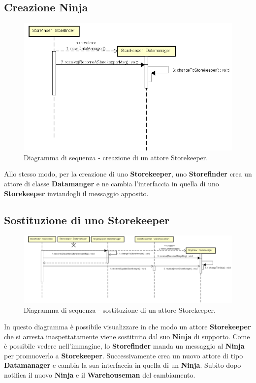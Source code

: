 \documentclass[a4paper]{article}
\begin{document}
         \subsection{Creazione Ninja}
            \begin{figure} [H]
				\centering
				\includegraphics[width=\textwidth]{ST/seq/CreazioneStorekeeper.png}
				\caption{Diagramma di sequenza - creazione di un attore Storekeeper.}
			\end{figure}
            Allo stesso modo, per la creazione di uno \textbf{Storekeeper}, uno \textbf{Storefinder} crea un attore di classe \textbf{Datamanger} e ne cambia l'interfaccia in quella di 
            uno \textbf{Storekeeper} inviandogli il messaggio apposito.
            
         \subsection{Sostituzione di uno Storekeeper}
            \begin{figure} [H]
				\centering
				\includegraphics[width=\textwidth]{ST/seq/SostituzioneStorekeeper.png}
				\caption{Diagramma di sequenza - sostituzione di un attore Storekeeper.}
			\end{figure}
            In questo diagramma è possibile visualizzare in che modo un attore \textbf{Storekeeper} che si arresta inaspettatamente viene sostituito dal suo \textbf{Ninja} di supporto.
            Come è possibile vedere nell'immagine, lo \textbf{Storefinder} manda un messaggio al \textbf{Ninja} per promuoverlo a \textbf{Storekeeper}. Successivamente crea un nuovo attore 
            di tipo \textbf{Datamanager} e cambia la sua interfaccia in quella di un \textbf{Ninja}. Subito dopo notifica il nuovo \textbf{Ninja} e il \textbf{Warehouseman} del cambiamento.
	
\end{document}
